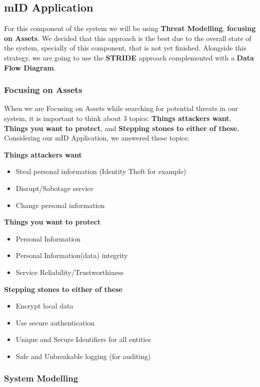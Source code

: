 \subsection{mID Application}

For this component of the system we will be using \textbf{Threat Modelling}, \textbf{focusing on Assets}. We decided that this approach is the best due to the overall state of the system, specially of this component, that is not yet finished.
Alongside this strategy, we are going to use the \textbf{STRIDE} approach complemented with a \textbf{Data Flow Diagram}.

\subsubsection{Focusing on Assets}

When we are Focusing on Assets while searching for potential threats in our system, it is important to think about 3 topics: \textbf{Things attackers want}, \textbf{Things you want to protect}, and \textbf{Stepping stones to either of these.} Considering our mID Application, we answered these topics:

\textbf{Things attackers want}
\begin{itemize}
  \item Steal personal information (Identity Theft for example)
  \item Disrupt/Sabotage service
  \item Change personal information
\end{itemize}

\textbf{Things you want to protect}
\begin{itemize}
  \item Personal Information
  \item Personal Information(data) integrity
  \item Service Reliability/Trustworthiness 
\end{itemize}

\textbf{Stepping stones to either of these}
\begin{itemize}
  \item Encrypt local data
  \item Use secure authentication
  \item Unique and Secure Identifiers for all entities
  \item Safe and Unbreakable logging (for auditing)
\end{itemize}

\subsubsection{System Modelling}

